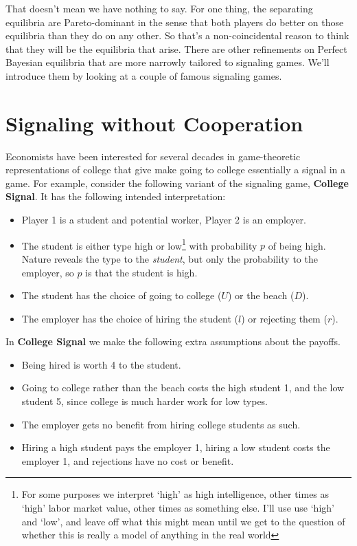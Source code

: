 \documentclass[
  11pt,
  letterpaper,
]{scrbook}
\providecommand{\tightlist}{%
  \setlength{\itemsep}{0pt}\setlength{\parskip}{0pt}}
\begin{document}
That doesn't mean we have nothing to say. For one thing, the separating
equilibria are Pareto-dominant in the sense that both players do better
on those equilibria than they do on any other. So that's a
non-coincidental reason to think that they will be the equilibria that
arise. There are other refinements on Perfect Bayesian equilibria that
are more narrowly tailored to signaling games. We'll introduce them by
looking at a couple of famous signaling games.

\section{Signaling without
Cooperation}\label{sec-signaling-without-cooperation}

Economists have been interested for several decades in game-theoretic
representations of college that give make going to college essentially a
signal in a game. For example, consider the following variant of the
signaling game, \textbf{College Signal}. It has the following intended
interpretation:

\begin{itemize}
\tightlist
\item
  Player 1 is a student and potential worker, Player 2 is an employer.
\item
  The student is either type high or low\footnote{For some purposes we
    interpret `high' as high intelligence, other times as `high' labor
    market value, other times as something else. I'll use use `high' and
    `low', and leave off what this might mean until we get to the
    question of whether this is really a model of anything in the real
    world} with probability \(p\) of being high. Nature reveals the type
  to the \emph{student}, but only the probability to the employer, so
  \(p\) is that the student is high.
\item
  The student has the choice of going to college (\(U\)) or the beach
  (\(D\)).
\item
  The employer has the choice of hiring the student (\(l\)) or rejecting
  them (\(r\)).
\end{itemize}

In \textbf{College Signal} we make the following extra assumptions about
the payoffs.

\begin{itemize}
\tightlist
\item
  Being hired is worth 4 to the student.
\item
  Going to college rather than the beach costs the high student 1, and
  the low student 5, since college is much harder work for low types.
\item
  The employer gets no benefit from hiring college students as such.
\item
  Hiring a high student pays the employer 1, hiring a low student costs
  the employer 1, and rejections have no cost or benefit.
\end{itemize}
\end{document}
